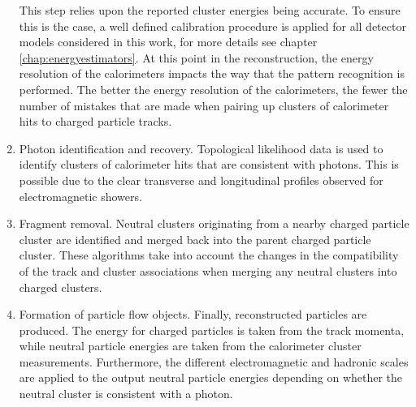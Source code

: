 \begin{enumerate}
This step relies upon the reported cluster energies being accurate.  To ensure this is the case, a well defined calibration procedure is applied for all detector models considered in this work, for more details see chapter \ref{chap:energyestimators}.  At this point in the reconstruction, the energy resolution of the calorimeters impacts the way that the pattern recognition is performed.  The better the energy resolution of the calorimeters, the fewer the number of mistakes that are made when pairing up clusters of calorimeter hits to charged particle tracks.    

\item Photon identification and recovery.  Topological likelihood data is used to identify clusters of calorimeter hits that are consistent with photons.  This is possible due to the clear transverse and longitudinal profiles observed for electromagnetic showers.  
\item Fragment removal.  Neutral clusters originating from a nearby charged particle cluster are identified and merged back into the parent charged particle cluster.  These algorithms take into account the changes in the compatibility of the track and cluster associations when merging any neutral clusters into charged clusters.  
\item Formation of particle flow objects.  Finally, reconstructed particles are produced.  The energy for charged particles is taken from the track momenta, while neutral particle energies are taken from the calorimeter cluster measurements.  Furthermore, the different electromagnetic and hadronic scales are applied to the output neutral particle energies depending on whether the neutral cluster is consistent with a photon.  
\end{enumerate}

